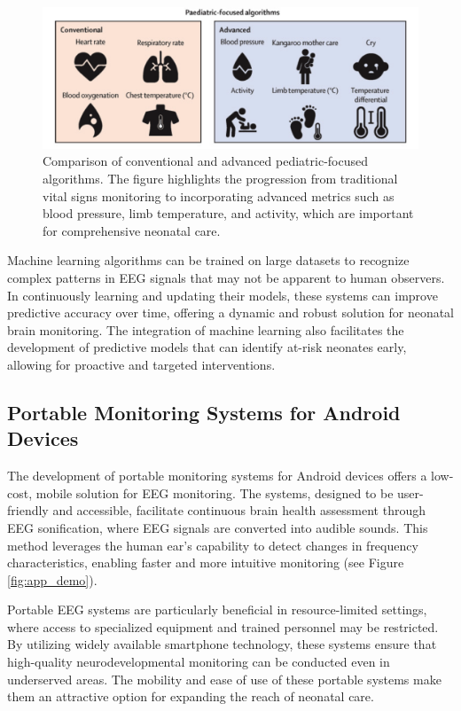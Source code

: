 \documentclass[12pt,journal,compsoc]{IEEEtran}
\begin{document}
\begin{figure}[H]
    \centering
    \includegraphics[width=0.8\linewidth]{pediatric_algorithms.png}
    \caption{Comparison of conventional and advanced pediatric-focused algorithms. The figure highlights the progression from traditional vital signs monitoring to incorporating advanced metrics such as blood pressure, limb temperature, and activity, which are important for comprehensive neonatal care.}
    \label{fig:pediatric_algorithms}
\end{figure}

Machine learning algorithms can be trained on large datasets to recognize complex patterns in EEG signals that may not be apparent to human observers. In continuously learning and updating their models, these systems can improve predictive accuracy over time, offering a dynamic and robust solution for neonatal brain monitoring. The integration of machine learning also facilitates the development of predictive models that can identify at-risk neonates early, allowing for proactive and targeted interventions.

\subsection{Portable Monitoring Systems for Android Devices}

The development of portable monitoring systems for Android devices offers a low-cost, mobile solution for EEG monitoring. The systems, designed to be user-friendly and accessible, facilitate continuous brain health assessment through EEG sonification, where EEG signals are converted into audible sounds. This method leverages the human ear's capability to detect changes in frequency characteristics, enabling faster and more intuitive monitoring (see Figure \ref{fig:app_demo}).

Portable EEG systems are particularly beneficial in resource-limited settings, where access to specialized equipment and trained personnel may be restricted. By utilizing widely available smartphone technology, these systems ensure that high-quality neurodevelopmental monitoring can be conducted even in underserved areas. The mobility and ease of use of these portable systems make them an attractive option for expanding the reach of neonatal care.
\end{document}
